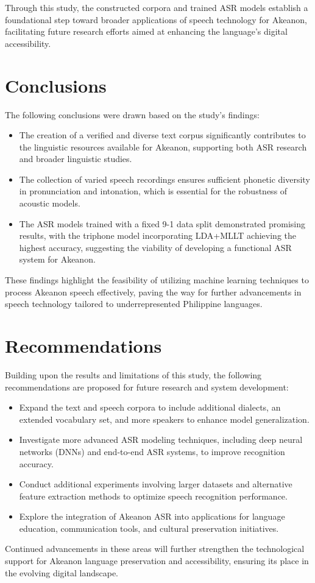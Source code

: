Through this study, the constructed corpora and trained ASR models establish a foundational step toward broader applications of speech technology for Akeanon, facilitating future research efforts aimed at enhancing the language’s digital accessibility.

\section{Conclusions}

The following conclusions were drawn based on the study's findings:

\begin{itemize} \item The creation of a verified and diverse text corpus significantly contributes to the linguistic resources available for Akeanon, supporting both ASR research and broader linguistic studies. \item The collection of varied speech recordings ensures sufficient phonetic diversity in pronunciation and intonation, which is essential for the robustness of acoustic models. \item The ASR models trained with a fixed 9-1 data split demonstrated promising results, with the triphone model incorporating LDA+MLLT achieving the highest accuracy, suggesting the viability of developing a functional ASR system for Akeanon. \end{itemize}

These findings highlight the feasibility of utilizing machine learning techniques to process Akeanon speech effectively, paving the way for further advancements in speech technology tailored to underrepresented Philippine languages.

\section{Recommendations}

Building upon the results and limitations of this study, the following recommendations are proposed for future research and system development:

\begin{itemize} \item Expand the text and speech corpora to include additional dialects, an extended vocabulary set, and more speakers to enhance model generalization. \item Investigate more advanced ASR modeling techniques, including deep neural networks (DNNs) and end-to-end ASR systems, to improve recognition accuracy. \item Conduct additional experiments involving larger datasets and alternative feature extraction methods to optimize speech recognition performance. \item Explore the integration of Akeanon ASR into applications for language education, communication tools, and cultural preservation initiatives. \end{itemize}

Continued advancements in these areas will further strengthen the technological support for Akeanon language preservation and accessibility, ensuring its place in the evolving digital landscape.